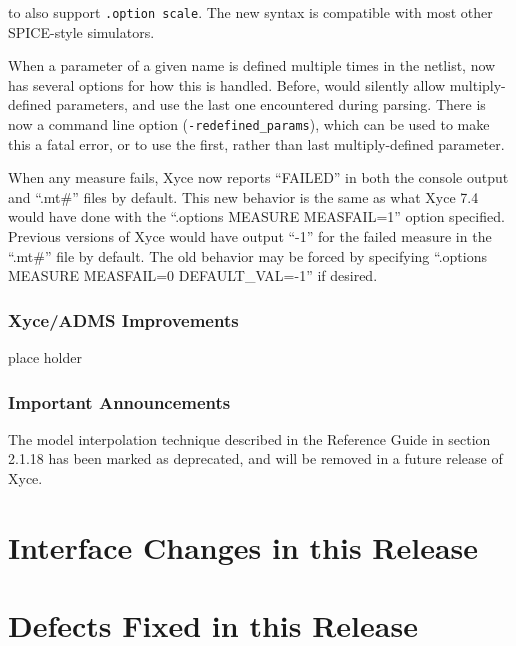 \documentclass[letterpaper]{scrartcl}
\begin{document}
\begin{XyceItemize}
   to also support \texttt{.option scale}.  The new syntax is
   compatible with most other SPICE-style simulators.
 \item When a parameter of a given name is defined multiple times in
   the netlist, \Xyce{} now has several options for how this is
   handled.  Before, \Xyce{} would silently allow multiply-defined
   parameters, and use the last one encountered during parsing.  There
   is now a command line option (\texttt{-redefined\_params}), which
   can be used to make this a fatal error, or to use the first, rather
   than last multiply-defined parameter.
 \item When any measure fails, Xyce now reports ``FAILED'' in both the
   console output and ``.mt\#'' files by default.  This new behavior is
   the same as what Xyce 7.4 would have done with the ``.options
   MEASURE MEASFAIL=1'' option specified.  Previous versions of Xyce
   would have output ``-1'' for the failed measure in the ``.mt\#''
   file by default.  The old behavior may be forced by specifying
   ``.options MEASURE MEASFAIL=0 DEFAULT\_VAL=-1'' if desired.
\end{XyceItemize}

\subsubsection*{Xyce/ADMS Improvements}
\begin{XyceItemize}
  \item place holder
\end{XyceItemize}

\subsubsection*{Important Announcements}
\begin{XyceItemize}
\item The model interpolation technique described in the \Xyce{}
  Reference Guide in section 2.1.18 has been marked as deprecated, and
  will be removed in a future release of Xyce.
\end{XyceItemize}

\newpage
\section{Interface Changes in this Release}


\newpage
\section{Defects Fixed in this Release}

\end{document}
